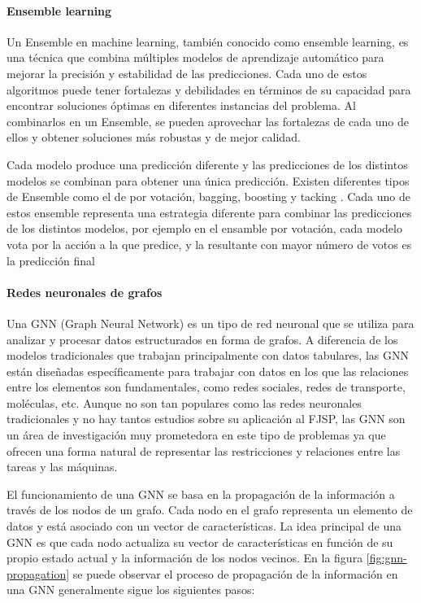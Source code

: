\paragraph{Ensemble learning}
Un Ensemble \cite{Kundu_2023} en machine learning, también conocido como ensemble learning, es
una técnica que combina múltiples modelos de aprendizaje automático para
mejorar la precisión y estabilidad de las predicciones. Cada uno de estos
algoritmos puede tener fortalezas y debilidades en términos de su capacidad
para encontrar soluciones óptimas en diferentes instancias del problema. Al
combinarlos en un Ensemble, se pueden aprovechar las fortalezas de cada uno de
ellos y obtener soluciones más robustas y de mejor calidad.\medskip

Cada modelo produce una predicción diferente y las predicciones de los
distintos modelos se combinan para obtener una única predicción. Existen
diferentes tipos de Ensemble como el de por votación, bagging, boosting y
tacking \cite{Ensemble_Algorithms}. Cada uno de estos ensemble representa una 
estrategia diferente para combinar las predicciones de los distintos modelos, 
por ejemplo en el ensamble por votación, cada modelo vota por la acción a la 
que predice, y la resultante con mayor número de votos es la predicción final

\paragraph{Redes neuronales de grafos}
Una GNN (Graph Neural Network) \cite{pytorch-geometric} es un tipo de red
neuronal que se utiliza para analizar y procesar datos estructurados en forma
de grafos. A diferencia de los modelos tradicionales que trabajan
principalmente con datos tabulares, las GNN están diseñadas específicamente
para trabajar con datos en los que las relaciones entre los elementos son
fundamentales, como redes sociales, redes de transporte, moléculas, etc. Aunque
no son tan populares como las redes neuronales tradicionales y no hay tantos
estudios sobre su aplicación al FJSP, las GNN son un área de investigación muy
prometedora en este tipo de problemas ya que ofrecen una forma natural de
representar las restricciones y relaciones entre las tareas y las
máquinas.\medskip

El funcionamiento de una GNN se basa en la propagación de la
información \cite{Message_parrs} a través de los nodos de un grafo. Cada nodo en
el grafo representa un elemento de datos y está asociado con un vector de
características. La idea principal de una GNN es que cada nodo actualiza su
vector de características en función de su propio estado actual y la
información de los nodos vecinos. En la figura \ref{fig:gnn-propagation} se puede observar
el proceso de propagación de la información en una GNN generalmente sigue los 
siguientes pasos:

